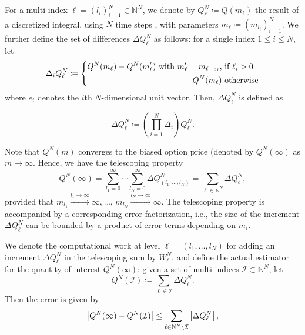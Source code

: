 \documentclass[11pt]{article}
\newcommand{\nset}{\mathbb{N}}
\begin{document}
For a multi-index $\ell = (l_i)_{i=1}^{N} \in \mathbb{N}^{N}$, we denote by
$Q^N_\ell \coloneqq Q(m_{\ell})$ the result of a discretized
integral, using $N$ time steps , with parameters $m_\ell \coloneqq (m_{l_i})_{i=1}^{N}$. We further define the set of
differences $\Delta Q^N_\ell$ as follows: for a single index $1 \le i \le N$,
let
\begin{equation}
\Delta_i Q^N_\ell \coloneqq \left\{ 
\aligned 
Q^N(m_\ell) - Q^N(m_\ell') \text{ with } m_\ell' =
m_{\ell - e_i}, & \text{ if } \ell_i>0 \\
Q^N(m_\ell) & \text{ otherwise}
\endaligned
\right.
\end{equation}
where $e_i$ denotes the $i$th $N$-dimensional unit vector.  Then, $\Delta
Q^N_\ell$ is defined as

%



\begin{equation}
\Delta Q^N_\ell \coloneqq \left( \prod_{i=1}^{N} \Delta_i \right) Q^N_\ell.
\end{equation}


Note that $Q^N(m)$ converges to the biased option price (denoted by $Q^N(\infty)$ as
$m \to \infty$. Hence, we have the telescoping property
\begin{equation}
Q^N(\infty) = \sum_{l_1=0}^\infty \cdots \sum_{l_{N} = 0}^\infty \Delta
Q^N_{(l_1, \ldots, l_{N})} = \sum_{\ell \in \mathbb{N}^{N}} \Delta Q^N_\ell,
\end{equation}
provided that $m_{l_1} \xrightarrow{l_1 \to \infty} \infty$, \ldots,
$m_{l_{N}} \xrightarrow{l_{N} \to \infty} \infty$. The telescoping property
is accompanied by a corresponding error factorization, i.e., the size of the
increment $\Delta Q^N_\ell$ can be bounded by a product of error terms depending
on $m_i$.


We denote the computational work at level $\ell = (l_1, \ldots, l_{N})$  for adding an increment $\Delta Q^N_{\ell}$
in the telescoping sum by  $W^N_\ell$, and   define the actual estimator for the quantity of interest
$Q^N(\infty)$: given a set of multi-indices $\mathcal{I} \subset
\mathbb{N}^{N}$, let
\begin{equation*}
	Q^N(\mathcal{I}) \coloneqq \sum_{\ell \in \mathcal{I}} \Delta Q^N_\ell.
\end{equation*}
Then the error is given by
\begin{equation*}
	\left\lvert Q^N(\infty) - Q^N(\mathcal{I})\right\rvert \le \sum_{\ell \in \mathbb{N}^{N} \setminus
		\mathcal{I}} \left\lvert\Delta Q^N_\ell\right\rvert,
\end{equation*}
\end{document}
